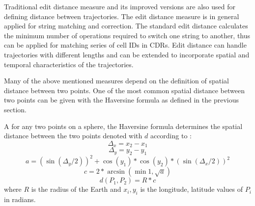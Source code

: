Traditional edit distance measure and its improved versions are also used for defining distance between trajectories. 
The edit distance measure is in general applied for string matching and correction. The standard edit distance calculates the minimum number of operations required to switch one string to another, thus can be applied for matching series of cell IDs in CDRs. Edit distance can handle trajectories with different lengths and can be extended to incorporate spatial and temporal characteristics of the trajectories. \cite{spatial_edit}

Many of the above mentioned measures depend on the definition of spatial distance between two points. One of the most common spatial distance between two points can be given with the Haversine formula as defined in the previous section.

\begin{definition}
A for any two points on a sphere, the Haversine formula determines the spatial distance between the two points denoted with $d$ according to \cite{haversine}:
    \[\Delta_{x} = x_{2} - x_{1}\]
    \[\Delta_{y} = y_{2} - y_{1}\]
    \[a = (\sin(\Delta_{y}/2))^2 + \cos{(y_{1})} * \cos{(y_{2})} * (\sin{(\Delta_{x}/2)})^2 \]
    \[c = 2 * \arcsin{(\min{1,\sqrt{a}})}\]
    \[d(P_{1}, P_{2}) = R * c\]
    where $R$ is the radius of the Earth and $x_{i}, y_{i}$ is the longitude, latitude values of $P_{i}$ in radians.
\end{definition}

